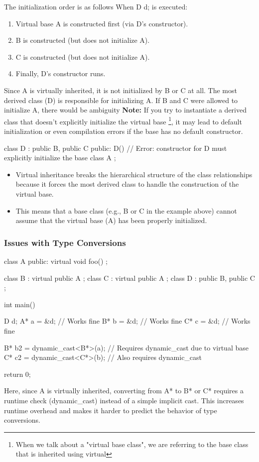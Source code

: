 \documentclass{report}
\begin{document}
\bigbreak \noindent 
The initialization order is as follows
\bigbreak \noindent 
When D d; is executed:
\begin{enumerate}
    \item Virtual base A is constructed first (via D's constructor).
    \item B is constructed (but does not initialize A).
    \item C is constructed (but does not initialize A).
    \item Finally, D's constructor runs.
\end{enumerate}
\bigbreak \noindent 
Since A is virtually inherited, it is not initialized by B or C at all. The most derived class (D) is responsible for initializing A. If B and C were allowed to initialize A, there would be ambiguity
\bigbreak \noindent 
\textbf{Note:} If you try to instantiate a derived class that doesn’t explicitly initialize the virtual base \footnote{When we talk about a "virtual base class", we are referring to the base class that is inherited using virtual}, it may lead to default initialization or even compilation errors if the base has no default constructor.
\bigbreak \noindent 
\begin{cppcode}
class D : public B, public C {
public:
    D() {}  // Error: constructor for D must explicitly initialize the base class A
};
\end{cppcode}
\bigbreak \noindent 
\begin{itemize}
    \item Virtual inheritance breaks the hierarchical structure of the class relationships because it forces the most derived class to handle the construction of the virtual base.
    \item This means that a base class (e.g., B or C in the example above) cannot assume that the virtual base (A) has been properly initialized.
\end{itemize}

\bigbreak \noindent 
\subsubsection{Issues with Type Conversions}
\bigbreak \noindent 
\begin{cppcode}
class A {
public:
    virtual void foo() {}
};

class B : virtual public A {};
class C : virtual public A {};
class D : public B, public C {};

int main() {
    D d;
    A* a = &d;  // Works fine
    B* b = &d;  // Works fine
    C* c = &d;  // Works fine

    B* b2 = dynamic_cast<B*>(a);  // Requires dynamic_cast due to virtual base
    C* c2 = dynamic_cast<C*>(b);  // Also requires dynamic_cast

    return 0;
}
\end{cppcode}
\bigbreak \noindent 
Here, since A is virtually inherited, converting from A* to B* or C* requires a runtime check (dynamic\_cast) instead of a simple implicit cast.
\bigbreak \noindent 
This increases runtime overhead and makes it harder to predict the behavior of type conversions.
\end{document}
